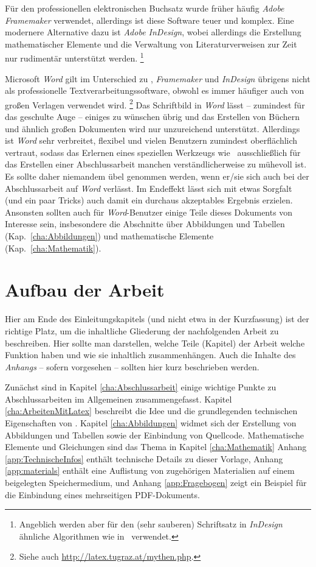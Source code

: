 Für den professionellen elektronischen Buchsatz wurde früher
häufig \emph{Adobe Framemaker} verwendet, allerdings ist diese
Software teuer und komplex. Eine modernere Alternative dazu ist
\emph{Adobe InDesign}, wobei allerdings die Erstellung
mathematischer Elemente und die Verwaltung von Literaturverweisen
zur Zeit nur rudimentär unterstützt werden.%
\footnote{Angeblich werden aber für den (sehr sauberen) Schriftsatz 
in \emph{InDesign} ähnliche Algorithmen wie in \latex\ verwendet.}

Microsoft \emph{Word} gilt im Unterschied zu \latex, 
\emph{Framemaker} und \emph{InDesign} übrigens nicht als professionelle
Textverarbeitungssoftware, obwohl es immer häufiger auch von
großen Verlagen verwendet wird.%
\footnote{Siehe auch \url{http://latex.tugraz.at/mythen.php}.}
Das Schriftbild in \emph{Word}
lässt -- zumindest für das geschulte Auge -- einiges zu wünschen
übrig und das Erstellen von Büchern und ähnlich großen Dokumenten
wird nur unzureichend unterstützt. Allerdings ist \emph{Word} sehr
verbreitet, flexibel und vielen Benutzern zumindest oberflächlich
vertraut, sodass das Erlernen eines speziellen Werkzeugs wie
\latex\ ausschließlich für das Erstellen einer Abschlussarbeit
manchen verständlicherweise zu mühevoll ist. Es sollte daher
niemandem übel genommen werden, wenn er/sie sich auch bei der Abschlussarbeit
auf \emph{Word} verlässt. Im Endeffekt lässt sich mit etwas
Sorgfalt (und ein paar Tricks) auch damit ein durchaus akzeptables
Ergebnis erzielen. 
Ansonsten sollten auch für \emph{Word}-Benutzer 
einige Teile dieses Dokuments von Interesse sein, insbesondere die
Abschnitte über Abbildungen und Tabellen
(Kap.~\ref{cha:Abbildungen}) und mathematische Elemente
(Kap.~\ref{cha:Mathematik}).


\section{Aufbau der Arbeit}

Hier am Ende des Einleitungskapitels (und nicht
etwa in der Kurzfassung) ist der richtige Platz, um die
inhaltliche Gliederung der nachfolgenden Arbeit zu beschreiben.
Hier sollte man darstellen, welche Teile (Kapitel) der Arbeit
welche Funktion haben und wie sie inhaltlich zusammenhängen. Auch
die Inhalte des \emph{Anhangs} -- sofern vorgesehen -- sollten hier
kurz beschrieben werden.

Zunächst sind in Kapitel \ref{cha:Abschlussarbeit} einige wichtige
Punkte zu Abschlussarbeiten im Allgemeinen zusammengefasst.
Kapitel \ref{cha:ArbeitenMitLatex} beschreibt die Idee und die
grundlegenden technischen Eigenschaften von \latex.
Kapitel \ref{cha:Abbildungen} widmet sich der Erstellung von Abbildungen
und Tabellen sowie der Einbindung von Quellcode.
Mathematische Elemente und Gleichungen sind das Thema in Kapitel \ref{cha:Mathematik} 
\usw
Anhang \ref{app:TechnischeInfos} enthält technische Details zu
dieser Vorlage, 
Anhang \ref{app:materials} enthält eine Auflistung von zugehörigen Materialien
auf einem beigelegten Speichermedium, und 
Anhang \ref{app:Fragebogen} zeigt ein Beispiel für die
Einbindung eines mehrseitigen PDF-Dokuments.






